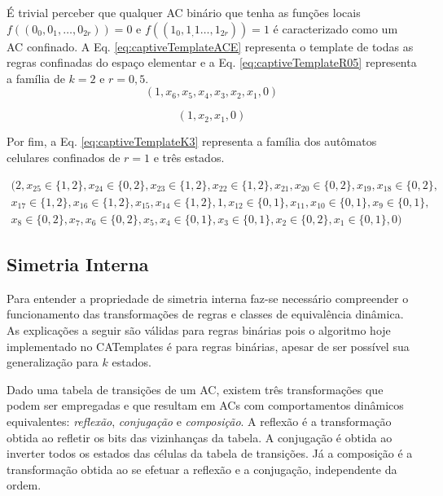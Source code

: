 É trivial perceber que qualquer AC binário que tenha as funções locais $f((0_0, 0_1,\dots, 0_{2r})) = 0$ e $f((1_0, 1_,1\dots, 1_{2r})) = 1$ é caracterizado como um AC confinado. A Eq. \eqref{eq:captiveTemplateACE} representa o template de todas as regras confinadas do espaço elementar e a Eq. \eqref{eq:captiveTemplateR05} representa a família de $k=2$ e $r=0,5$.
\begin{equation}
(1,x_6,x_5,x_4,x_3,x_2,x_1,0)
\label{eq:captiveTemplateACE}
\end{equation}

\begin{equation}
(1,x_2,x_1,0)
\label{eq:captiveTemplateR05}
\end{equation}

Por fim, a Eq. \eqref{eq:captiveTemplateK3} representa a família dos autômatos celulares confinados de $r=1$ e três estados.

\begin{equation}
\begin{split}
(2, x_{25} \in \{1,2\}, x_{24} \in \{0,2\}, x_{23} \in \{1,2\}, x_{22} \in \{1,2\}, x_{21}, x_{20} \in \{0,2\}, x_{19}, x_{18} \in \{0,2\}, \\
x_{17} \in \{1,2\}, x_{16} \in \{1,2\}, x_{15}, x_{14} \in \{1,2\},1, x_{12} \in \{0,1\}, x_{11}, x_{10} \in \{0,1\}, x_9 \in \{0,1\}, \\
x_8 \in \{0,2\}, x_7, x_6 \in \{0,2\}, x_5, x_4 \in \{0,1\}, x_3 \in \{0,1\}, x_2 \in \{0,2\}, x_1 \in \{0,1\}, 0)
\label{eq:captiveTemplateK3}
\end{split}
\end{equation}

\subsection{Simetria Interna}
Para entender a propriedade de simetria interna faz-se necessário compreender o funcionamento das transformações de regras e classes de equivalência dinâmica. As explicações a seguir são válidas para regras binárias pois o algoritmo hoje implementado no CATemplates é para regras binárias, apesar de ser possível sua generalização para $k$ estados.

Dado uma tabela de transições de um AC, existem três transformações que podem ser empregadas e que resultam em ACs com comportamentos dinâmicos equivalentes: \textit{reflexão}, \textit{conjugação} e \textit{composição}. A reflexão é a transformação obtida ao refletir os bits das vizinhanças da tabela. A conjugação é obtida ao inverter todos os estados das células da tabela de transições. Já a composição é a transformação obtida ao se efetuar a reflexão e a conjugação, independente da ordem.


